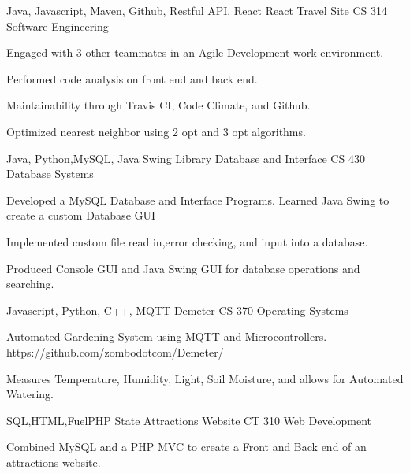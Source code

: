 \vspace{-.5\baselineskip}
\begin{cventries}
  \cventry
    {Java, Javascript, Maven, Github, Restful API, React}
    {React Travel Site}
    {}
    {CS 314 Software Engineering}
    {
      \begin{cvitems}
        \item {Engaged with 3 other teammates in an Agile Development work environment.}
        \item {Performed code analysis on front end and back end.}
        \item {Maintainability through Travis CI, Code Climate, and Github.}
        \item {Optimized nearest neighbor using 2 opt and 3 opt algorithms.}
      \end{cvitems}
    }
      \cventry
    {Java, Python,MySQL, Java Swing}
    {Library Database and Interface}
    {}
    {CS 430 Database Systems}
    {
      \begin{cvitems}
        \item {Developed a MySQL Database and Interface Programs. Learned Java Swing to create a custom Database GUI}
        \item {Implemented custom file read in,error checking, and input into a database.}
        \item {Produced Console GUI and Java Swing GUI for database operations and searching.}
      \end{cvitems}
    }
  \cventry
    {Javascript, Python, C++, MQTT}
    {Demeter}
    {}
    {CS 370 Operating Systems}
    {
      \begin{cvitems}
        \item {Automated Gardening System using MQTT and Microcontrollers. https://github.com/zombodotcom/Demeter/}
        \item {Measures Temperature, Humidity, Light, Soil Moisture, and allows for Automated Watering.}
      \end{cvitems}
    }
  \cventry
    {SQL,HTML,FuelPHP}
    {State Attractions Website}
    {}
    {CT 310 Web Development }
    {
      \begin{cvitems}
        \item {Combined MySQL and a PHP MVC to create a Front and Back end of an attractions website.}
      \end{cvitems}
    }
\end{cventries}
\vspace{-1.5\baselineskip}
